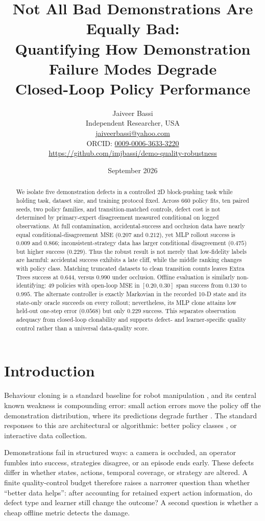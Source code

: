\documentclass[10pt,twocolumn]{article}
\title{\vspace{-1.2em}\textbf{Not All Bad Demonstrations Are Equally Bad:}\\
Quantifying How Demonstration Failure Modes Degrade\\
Closed-Loop Policy Performance}
\author{Jaiveer Bassi\\
\small Independent Researcher, USA\\
\small\href{mailto:jaiveerbassi@yahoo.com}{jaiveerbassi@yahoo.com}\\
\small ORCID: \href{https://orcid.org/0009-0006-3633-3220}{0009-0006-3633-3220}\\
\small\url{https://github.com/imjbassi/demo-quality-robustness}}
\date{September 2026}
\begin{document}
\maketitle

\begin{abstract}
\noindent
We isolate five demonstration defects in a controlled 2D block-pushing task
while holding task, dataset size, and training protocol fixed. Across 660
policy fits, ten paired seeds, two policy families, and transition-matched
controls, defect cost is not determined by primary-expert disagreement
measured conditional on logged observations. At full contamination,
accidental-success and occlusion data have nearly equal conditional-disagreement
MSE ($0.207$ and $0.212$), yet MLP rollout
success is $0.009$ and $0.866$; inconsistent-strategy data has larger
conditional disagreement ($0.475$) but higher success ($0.229$). Thus the robust result is not
merely that low-fidelity labels are harmful: accidental success exhibits a
late cliff, while the middle ranking changes with policy class. Matching
truncated datasets to clean transition counts leaves Extra Trees success at
$0.644$, versus $0.990$ under occlusion. Offline evaluation is similarly
non-identifying: 49 policies with open-loop MSE in
$[0.20,0.30]$ span success from $0.130$ to $0.995$. The alternate controller
is exactly Markovian in the recorded 10-D state and its state-only oracle
succeeds on every rollout; nevertheless, its MLP clone attains low held-out
one-step error ($0.0568$) but only $0.229$ success. This separates observation
adequacy from closed-loop clonability and supports defect- and
learner-specific quality control rather than a universal data-quality score.
\end{abstract}

\section{Introduction}

Behaviour cloning is a standard baseline for robot manipulation
\cite{pomerleau1989alvinn}, and its central known weakness is compounding
error: small action errors move the policy off the demonstration distribution,
where its predictions degrade further \cite{ross2011dagger}. The standard
responses to this are architectural or algorithmic: better policy classes
\cite{chi2023diffusion}, or interactive data collection.

Demonstrations fail in structured ways: a camera is occluded, an operator
fumbles into success, strategies disagree, or an episode ends early. These
defects differ in whether states, actions, temporal coverage, or strategy are
altered. A finite quality-control budget therefore raises a narrower question
than whether ``better data helps'': after accounting for retained expert
action information, do defect type and learner still change the outcome?
A second question is whether a cheap offline metric detects the damage.
\end{document}
